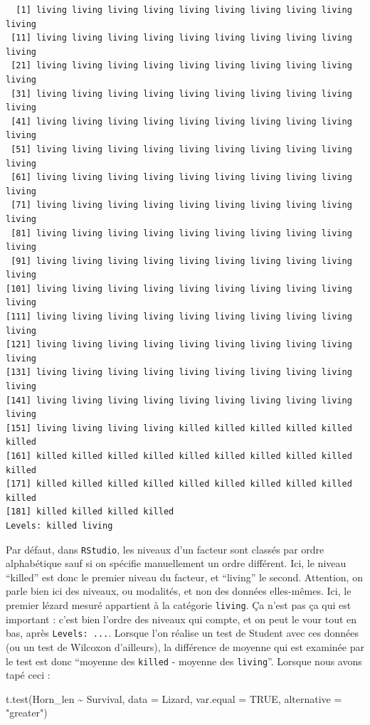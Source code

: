 \documentclass[
  french,
  a4paper,
  DIV=11,
  numbers=noendperiod,
  oneside]{scrreprt}
\newenvironment{Shaded}{}{}
\newcommand{\AttributeTok}[1]{\textcolor[rgb]{0.84,0.23,0.29}{#1}}
\newcommand{\ConstantTok}[1]{\textcolor[rgb]{0.00,0.36,0.77}{#1}}
\newcommand{\FunctionTok}[1]{\textcolor[rgb]{0.44,0.26,0.76}{#1}}
\newcommand{\NormalTok}[1]{\textcolor[rgb]{0.14,0.16,0.18}{#1}}
\newcommand{\SpecialCharTok}[1]{\textcolor[rgb]{0.00,0.36,0.77}{#1}}
\newcommand{\StringTok}[1]{\textcolor[rgb]{0.01,0.18,0.38}{#1}}
\begin{document}
\begin{verbatim}
  [1] living living living living living living living living living living
 [11] living living living living living living living living living living
 [21] living living living living living living living living living living
 [31] living living living living living living living living living living
 [41] living living living living living living living living living living
 [51] living living living living living living living living living living
 [61] living living living living living living living living living living
 [71] living living living living living living living living living living
 [81] living living living living living living living living living living
 [91] living living living living living living living living living living
[101] living living living living living living living living living living
[111] living living living living living living living living living living
[121] living living living living living living living living living living
[131] living living living living living living living living living living
[141] living living living living living living living living living living
[151] living living living living killed killed killed killed killed killed
[161] killed killed killed killed killed killed killed killed killed killed
[171] killed killed killed killed killed killed killed killed killed killed
[181] killed killed killed killed
Levels: killed living
\end{verbatim}

Par défaut, dans \texttt{RStudio}, les niveaux d'un facteur sont classés
par ordre alphabétique sauf si on spécifie manuellement un ordre
différent. Ici, le niveau ``killed'' est donc le premier niveau du
facteur, et ``living'' le second. Attention, on parle bien ici des
niveaux, ou modalités, et non des données elles-mêmes. Ici, le premier
lézard mesuré appartient à la catégorie \texttt{living}. Ça n'est pas ça
qui est important : c'est bien l'ordre des niveaux qui compte, et on
peut le vour tout en bas, après \texttt{Levels:\ ...}. Lorsque l'on
réalise un test de Student avec ces données (ou un test de Wilcoxon
d'ailleurs), la différence de moyenne qui est examinée par le test est
donc ``moyenne des \texttt{killed} - moyenne des \texttt{living}''.
Lorsque nous avons tapé ceci :

\begin{Shaded}
\begin{Highlighting}[]
\FunctionTok{t.test}\NormalTok{(Horn\_len }\SpecialCharTok{\textasciitilde{}}\NormalTok{ Survival, }\AttributeTok{data =}\NormalTok{ Lizard, }\AttributeTok{var.equal =} \ConstantTok{TRUE}\NormalTok{,}
       \AttributeTok{alternative =} \StringTok{"greater"}\NormalTok{)}
\end{Highlighting}
\end{Shaded}
\end{document}
